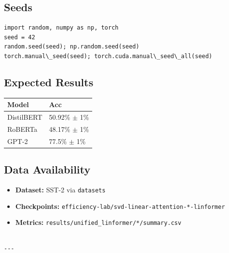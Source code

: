 \subsection{Seeds}

\begin{lstlisting}
import random, numpy as np, torch
seed = 42
random.seed(seed); np.random.seed(seed)
torch.manual\_seed(seed); torch.cuda.manual\_seed\_all(seed)
\end{lstlisting}

\subsection{Expected Results}

\begin{table}[H]
\centering
\small
\begin{tabular}{ll}
\toprule
\textbf{Model} & \textbf{Acc} \\
\midrule
DistilBERT & 50.92\% $\pm$ 1\% \\
RoBERTa & 48.17\% $\pm$ 1\% \\
GPT-2 & 77.5\% $\pm$ 1\% \\
\bottomrule
\end{tabular}
\end{table}

\subsection{Data Availability}

\begin{itemize}
\item \textbf{Dataset:} SST-2 via \texttt{datasets}
\item \textbf{Checkpoints:} \texttt{efficiency-lab/svd-linear-attention-*-linformer}
\item \textbf{Metrics:} \texttt{results/unified\_linformer/*/summary.csv}
\end{itemize}
\begin{lstlisting}

---
\end{lstlisting}